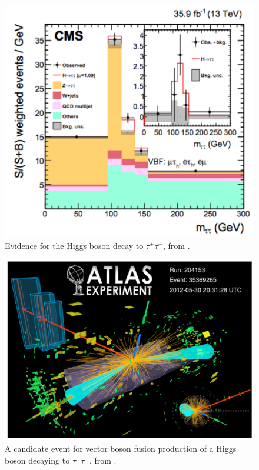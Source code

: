 \documentclass[12pt]{article}
\begin{document}
\begin{figure}
\begin{center}
\includegraphics[width=0.60\hsize]{CMStau2017.pdf}
\end{center}
\caption{Evidence for the Higgs boson decay to $\tau^+\tau^-$, from \cite{CMStau}.}
\label{fig:htautau}
\end{figure}

\begin{figure}
\begin{center}
\includegraphics[width=0.70\hsize]{htautauevent.pdf}
\end{center}
\caption{A candidate event for vector boson fusion production of a
  Higgs boson decaying to $\tau^+\tau^-$, from \cite{ATLAStau}.}
\label{fig:htautauevent}
\end{figure}
\end{document}
